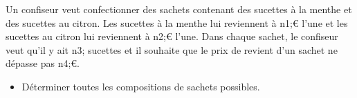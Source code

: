\documentclass[exercice]{thedocument}%
\begin{document}
%
Un confiseur veut confectionner des sachets contenant des sucettes
à la menthe et des sucettes au citron. Les sucettes à la menthe lui reviennent
à \<n1;{\euro} l'une et les sucettes au citron lui reviennent à \<n2;{\euro}
l'une. Dans chaque sachet, le confiseur veut qu'il y ait \<n3; sucettes et
il souhaite que le prix de revient d'un sachet ne dépasse pas \<n4;\euro.
\begin{itemize}
    \item Déterminer toutes les compositions de sachets possibles.
\end{itemize}
\end{document}
